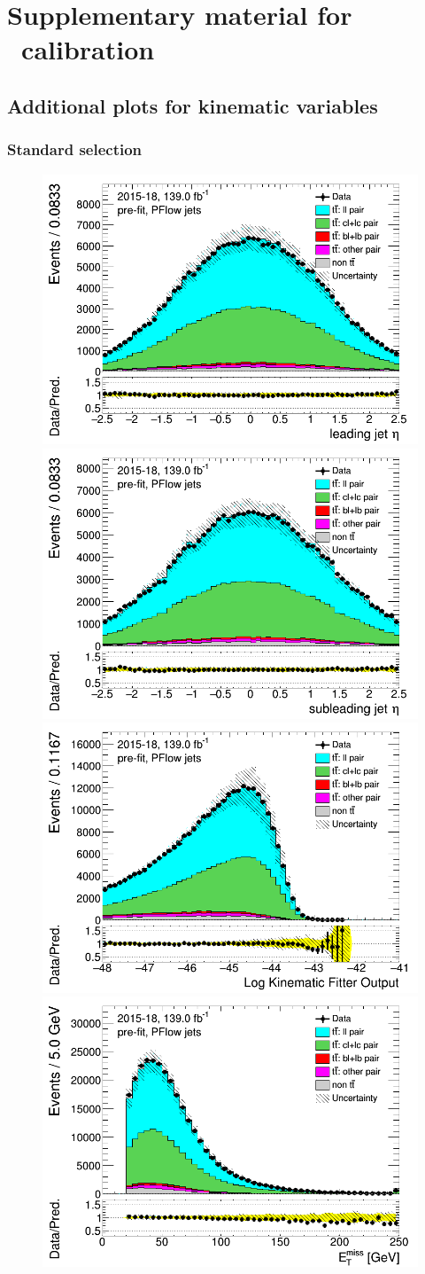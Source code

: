 
\chapter{Supplementary material for \cjet\ calibration}
\section{Additional plots for kinematic variables}
\subsection{Standard selection}

\label{sec:appendix_standard_selection}
\newpage	
\begin{figure}[H]
\includegraphics[width=.45\textwidth]{FTAG_plots/pretagNoRwwithouthighpTPFlowall/DataMC_h_J0_eta.png}
\includegraphics[width=.45\textwidth]{FTAG_plots/pretagNoRwwithouthighpTPFlowall/DataMC_h_J1_eta.png}\\
\includegraphics[width=.45\textwidth]{FTAG_plots/pretagNoRwwithouthighpTPFlowall/DataMC_h_LLR.png}
\includegraphics[width=.45\textwidth]{FTAG_plots/pretagNoRwwithouthighpTPFlowall/DataMC_h_MET.png}\\


\end{figure}
